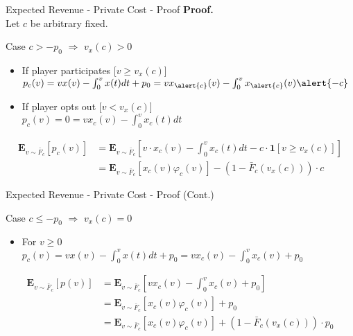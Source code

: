 \documentclass{beamer}
\begin{document}
\begin{frame}{Expected Revenue - Private Cost - Proof}
  \textbf{Proof.}\\

  Let $c$ be arbitrary fixed.

  Case $c > -p_0$ $\Rightarrow$ $v_x(c) > 0$ \\
  \begin{itemize}
    \item If player participates [$v \geq v_x(c)$]\\
          $p_c(v) = v x(v) - \int_0^vx(t)dt + p_0 = v x_{\alert{c}}(v) - \int_0^v x_{\alert{c}}(v) \alert{- c}$ \\
    \item If player opts out [$v < v_x(c)$]\\
          $p_c(v) = 0 = v x_c(v) - \int_0^v x_c(t) dt$
  \end{itemize}

  \begin{align*}
    \mathbf{E}_{v \sim \bar{F}_c}\left[p_c(v)\right] & = \mathbf{E}_{v \sim \bar{F}_c}\left[v \cdot x_c(v) - \int_0^v x_c(t)dt - c \cdot \mathbf{1}\left[v \geq v_x(c)\right]\right] \\
                                                     & = \mathbf{E}_{v \sim \bar{F}_c}\left[x_c(v)\varphi_c(v)\right] - (1 - \bar{F}_c(v_x(c))) \cdot c
  \end{align*}

\end{frame}
\begin{frame}{Expected Revenue - Private Cost - Proof (Cont.)}

  Case $c \leq -p_0$ $\Rightarrow$ $v_x(c) = 0$ \\
  \begin{itemize}
    \item For $v \geq 0$\\
          $p_c(v) = v x(v) - \int_0^vx(t)dt + p_0 = v x_c(v) - \int_0^v x_c(v) + p_0$ \\
  \end{itemize}

  \begin{align*}
    \mathbf{E}_{v \sim \bar{F}_c}\left[p(v)\right] & = \mathbf{E}_{v \sim \bar{F}_c} \left[v x_c(v) - \int_0^v x_c(v) + p_0 \right]                     \\
                                                   & = \mathbf{E}_{v \sim \bar{F}_c}\left[x_c(v)\varphi_c(v)\right] + p_0                               \\
                                                   & = \mathbf{E}_{v \sim \bar{F}_c}\left[x_c(v)\varphi_c(v)\right] + (1 - \bar{F}_c(v_x(c))) \cdot p_0
  \end{align*}

\end{frame}
\end{document}
